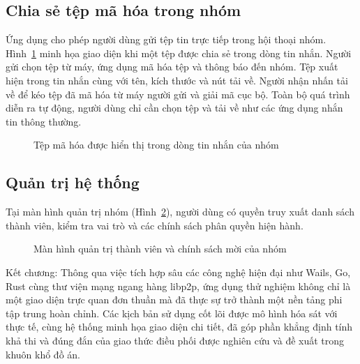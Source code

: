 \documentclass[../DoAn.tex]{subfiles}
\begin{document}
\clearpage
\subsection{Chia sẻ tệp mã hóa trong nhóm}

Ứng dụng cho phép người dùng gửi tệp tin trực tiếp trong hội thoại nhóm. Hình~\ref{fig:appendix_file_chat} minh họa giao diện khi một tệp được chia sẻ trong dòng tin nhắn. Người gửi chọn tệp từ máy, ứng dụng mã hóa tệp và thông báo đến nhóm. Tệp xuất hiện trong tin nhắn cùng với tên, kích thước và nút tải về. Người nhận nhấn tải về để kéo tệp đã mã hóa từ máy người gửi và giải mã cục bộ. Toàn bộ quá trình diễn ra tự động, người dùng chỉ cần chọn tệp và tải về như các ứng dụng nhắn tin thông thường.

\begin{figure}[htbp]
\centering
{}
\caption{Tệp mã hóa được hiển thị trong dòng tin nhắn của nhóm}
\label{fig:appendix_file_chat}
\end{figure}

\clearpage
\subsection{Quản trị hệ thống}

Tại màn hình quản trị nhóm (Hình~\ref{fig:appendix_group_management}), người dùng có quyền truy xuất danh sách thành viên, kiểm tra vai trò và các chính sách phân quyền hiện hành. 

\begin{figure}[htbp]
\centering
{}
\caption{Màn hình quản trị thành viên và chính sách mời của nhóm}
\label{fig:appendix_group_management}
\end{figure}

\clearpage
Kết chương: Thông qua việc tích hợp sâu các công nghệ hiện đại như Wails, Go, Rust cùng thư viện mạng ngang hàng libp2p, ứng dụng thử nghiệm không chỉ là một giao diện trực quan đơn thuần mà đã thực sự trở thành một nền tảng phi tập trung hoàn chỉnh. Các kịch bản sử dụng cốt lõi được mô hình hóa sát với thực tế, cùng hệ thống minh họa giao diện chi tiết, đã góp phần khẳng định tính khả thi và đúng đắn của giao thức điều phối được nghiên cứu và đề xuất trong khuôn khổ đồ án.
\end{document}
